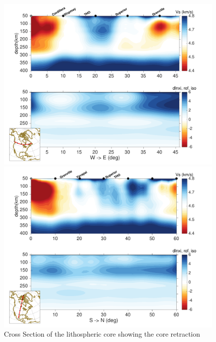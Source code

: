 \documentclass[12pt]{article}
\begin{document}
	\begin{figure}
		\begin{minipage}{0.5\linewidth}
			\centerline{\includegraphics[width=\linewidth]{figures/profiles_WE-50.pdf}}
		\end{minipage}
		\hfill
		\begin{minipage}{0.5\linewidth}
			\centerline{\includegraphics[width=\linewidth]{figures/profiles_SN-100.pdf}}
		\end{minipage}

		\caption{Cross Section of the lithospheric core showing the core retraction}
		\label{cratoncrossedge}

	\end{figure}
\end{document}
